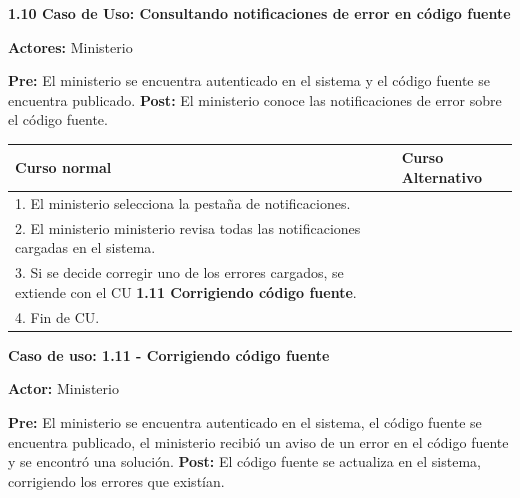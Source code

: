 \textbf{1.10 Caso de Uso: Consultando notificaciones de error en código fuente}

\textbf{Actores:} Ministerio 

\textbf{Pre:} El ministerio se encuentra autenticado en el sistema y el código fuente se encuentra publicado.
\textbf{Post:} El ministerio conoce las notificaciones de error sobre el código fuente.

\begin{table}[h!]
	
 \begin{tabular}{|p{7.5cm} | p{7.5cm}|} 
 \hline
 \textbf{Curso normal} & \textbf{Curso Alternativo} \\
 \hline


1. El ministerio selecciona la pestaña de notificaciones. & \\
\hline


2. El ministerio ministerio revisa todas las notificaciones cargadas en el sistema. & \\
\hline


3. Si se decide corregir uno de los errores cargados, se extiende con el CU \textbf{1.11 Corrigiendo código fuente}. & \\
\hline


4. Fin de CU. & \\
\hline




 \end{tabular}

\end{table}


\textbf{Caso de uso: 1.11 - Corrigiendo código fuente}

\textbf{Actor:} Ministerio

\textbf{Pre:} El ministerio se encuentra autenticado en el sistema, el código fuente se encuentra publicado, el ministerio recibió un aviso de un error en el código fuente y se encontró una solución.
\textbf{Post:} El código fuente se actualiza en el sistema, corrigiendo los errores que existían.

